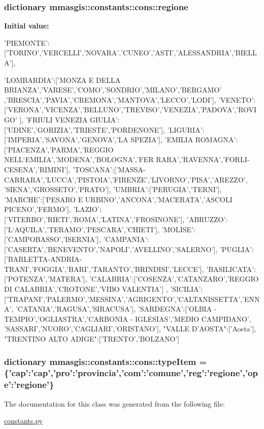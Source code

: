 \hypertarget{classmmasgis_1_1constants_1_1cons_a65ec63ca52da604dfa58670868bfbf0e}{
\subsubsection[{regione}]{\setlength{\rightskip}{0pt plus 5cm}dictionary {\bf mmasgis::constants::cons::regione}}}
\label{classmmasgis_1_1constants_1_1cons_a65ec63ca52da604dfa58670868bfbf0e}
{\bfseries Initial value:}
\begin{DoxyCode}
{'PIEMONTE':['TORINO','VERCELLI','NOVARA','CUNEO','ASTI','ALESSANDRIA','BIELLA'],
      
'LOMBARDIA':['MONZA E DELLA BRIANZA','VARESE','COMO','SONDRIO','MILANO','BERGAMO'
      ,'BRESCIA','PAVIA','CREMONA','MANTOVA','LECCO','LODI'],
'VENETO':['VERONA','VICENZA','BELLUNO','TREVISO','VENEZIA','PADOVA','ROVIGO'
],
'FRIULI VENEZIA GIULIA':['UDINE','GORIZIA','TRIESTE','PORDENONE'],
'LIGURIA':['IMPERIA','SAVONA','GENOVA','LA SPEZIA'],
'EMILIA ROMAGNA':['PIACENZA','PARMA','REGGIO NELL`EMILIA','MODENA','BOLOGNA','FER
      RARA','RAVENNA','FORLI-CESENA','RIMINI'],
'TOSCANA':['MASSA-CARRARA','LUCCA','PISTOIA','FIRENZE','LIVORNO','PISA','AREZZO',
      'SIENA','GROSSETO','PRATO'],
'UMBRIA':['PERUGIA','TERNI'],
'MARCHE':['PESARO E URBINO','ANCONA','MACERATA','ASCOLI PICENO','FERMO'],
'LAZIO':['VITERBO','RIETI','ROMA','LATINA','FROSINONE'],
'ABRUZZO':['L`AQUILA','TERAMO','PESCARA','CHIETI'],
'MOLISE':['CAMPOBASSO','ISERNIA'],
'CAMPANIA':['CASERTA','BENEVENTO','NAPOLI','AVELLINO','SALERNO'],
'PUGLIA':['BARLETTA-ANDRIA-TRANI','FOGGIA','BARI','TARANTO','BRINDISI','LECCE'],
'BASILICATA':['POTENZA','MATERA'],
'CALABRIA':['COSENZA','CATANZARO','REGGIO DI CALABRIA','CROTONE','VIBO VALENTIA']
      ,
'SICILIA':['TRAPANI','PALERMO','MESSINA','AGRIGENTO','CALTANISSETTA','ENNA',
'CATANIA','RAGUSA','SIRACUSA'],
'SARDEGNA':['OLBIA - TEMPIO','OGLIASTRA','CARBONIA - IGLESIAS','MEDIO CAMPIDANO',
      'SASSARI','NUORO','CAGLIARI','ORISTANO'],
"VALLE D'AOSTA":['Aosta'],
"TRENTINO ALTO ADIGE":['TRENTO','BOLZANO']}
\end{DoxyCode}
\hypertarget{classmmasgis_1_1constants_1_1cons_aeecb71fa74ba74bd56410600855018ef}{
\subsubsection[{typeItem}]{\setlength{\rightskip}{0pt plus 5cm}dictionary {\bf mmasgis::constants::cons::typeItem} = \{'cap':'cap','pro':'provincia','com':'comune','reg':'{\bf regione}','ope':'{\bf regione}'\}}}
\label{classmmasgis_1_1constants_1_1cons_aeecb71fa74ba74bd56410600855018ef}


The documentation for this class was generated from the following file:\begin{DoxyCompactItemize}
\item 
\hyperlink{constants_8py}{constants.py}\end{DoxyCompactItemize}
